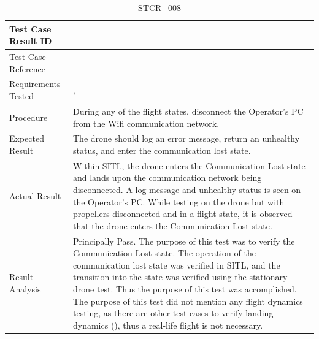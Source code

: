 \documentclass[12pt, titlepage]{article}
\begin{document}
\begin{table}[!h]
\begin{center}
\caption {STCR\_008}
\label{tab:STCR_008}
\begin{tabular}{ | m{3.2cm} | m{12.2cm} | } 
\hline
Test Case Result ID & \nameref{tab:STCR_008} \\ 
\hline
Test Case Reference & \nameref{tab:STC_008}  \\ 
\hline
Requirements Tested & \nameref{STA_010}, \nameref{TRANS_010}
\\ 
\hline
Procedure & During any of the flight states, disconnect the Operator's PC from the Wifi communication network.     \\ 
\hline
Expected Result & The drone should log an error message, return an unhealthy status, and enter the communication lost state.   \\ 
\hline
Actual Result & Within SITL, the drone enters the Communication Lost state and lands upon the communication network being disconnected. A log message and unhealthy status is seen on the Operator's PC. While testing on the drone but with propellers disconnected and in a flight state, it is observed that the drone enters the Communication Lost state.  \\ 
\hline
Result Analysis & Principally Pass. The purpose of this test was to verify the Communication Lost state. The operation of the communication lost state was verified in SITL, and the transition into the state was verified using the stationary drone test. Thus the purpose of this test was accomplished. The purpose of this test did not mention any flight dynamics testing, as there are other test cases to verify landing dynamics (\nameref{tab:STCR_003}), thus a real-life flight is not necessary.   \\ 
\hline
\end{tabular}
\end{center}
\end{table}
\end{document}
